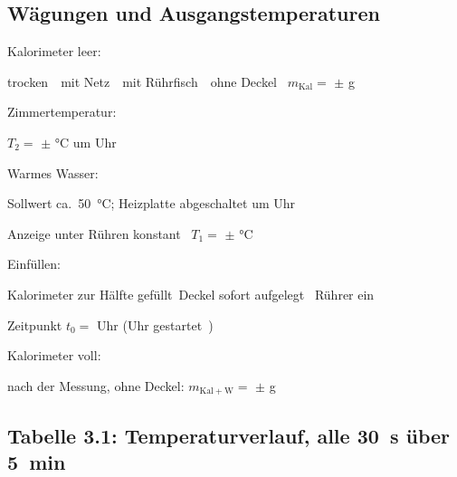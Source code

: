 \documentclass{article}
\newcommand{\bl}[1][3cm]{\underline{\hspace{#1}}}
\newcommand{\ak}{\raisebox{-0.4ex}{\setlength{\fboxsep}{0pt}\framebox[3.2mm]{\rule{0pt}{3.2mm}}}\,}
\newcommand{\einst}[2]{%
  \par\noindent\parbox[t]{3.3cm}{\raggedright #1}%
  \parbox[t]{11.7cm}{\raggedright #2\rule[-1.5mm]{0pt}{6mm}}\par}
\begin{document}
\subsection*{W\"agungen und Ausgangstemperaturen}

\einst{Kalorimeter leer:}{trocken \ak \ mit Netz \ak \ mit R\"uhrfisch \ak \ ohne Deckel \ak
  \quad $m_\mathrm{Kal} =$ \bl[2.2cm] $\pm$ \bl[1.4cm] g}
\einst{Zimmertemperatur:}{$T_2 =$ \bl[2cm] $\pm$ \bl[1.4cm] \si{\celsius} \quad
  um \bl[1.6cm] Uhr}
\einst{Warmes Wasser:}{Sollwert ca.\ \SI{50}{\celsius}; Heizplatte abgeschaltet um
  \bl[1.6cm] Uhr}
\einst{}{Anzeige unter R\"uhren konstant \ak \quad
  $T_1 =$ \bl[2cm] $\pm$ \bl[1.4cm] \si{\celsius}}
\einst{Einf\"ullen:}{Kalorimeter zur H\"alfte gef\"ullt \ak \quad Deckel sofort aufgelegt \ak
  \quad R\"uhrer ein \ak}
\einst{}{Zeitpunkt $t_0 =$ \bl[1.8cm] Uhr \quad (Uhr gestartet \ak)}
\einst{Kalorimeter voll:}{nach der Messung, ohne Deckel: $m_\mathrm{Kal+W} =$ \bl[2.2cm]
  $\pm$ \bl[1.4cm] g}

\subsection*{Tabelle 3.1: Temperaturverlauf, alle \SI{30}{\second} \"uber \SI{5}{\minute}}
\end{document}
